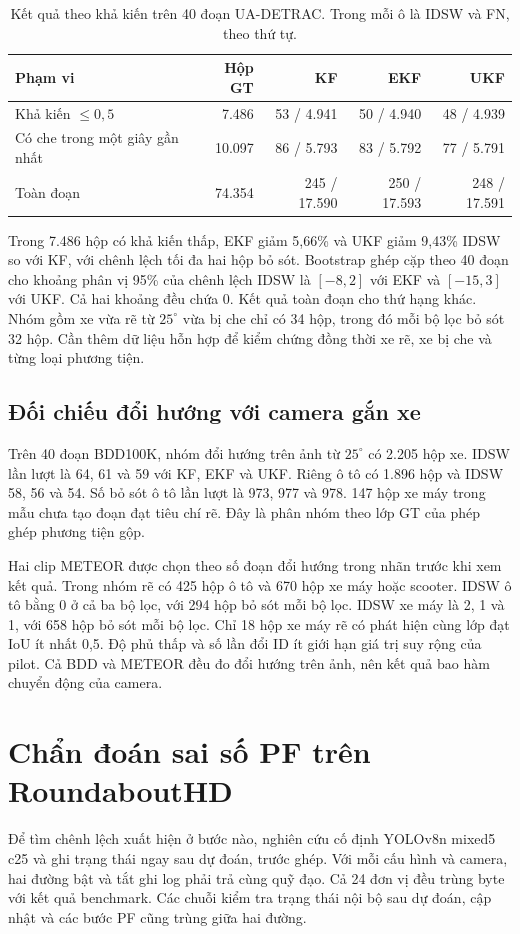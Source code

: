 \begin{table}[htbp]\centering\small
\caption{Kết quả theo khả kiến trên 40 đoạn UA-DETRAC. Trong mỗi ô là IDSW và FN, theo thứ tự.}\label{tab:ua-occlusion-r113}
\begin{tabular}{@{}lrrrr@{}}\toprule
Phạm vi & Hộp GT & KF & EKF & UKF\\\midrule
Khả kiến $\leq 0{,}5$ & 7.486 & 53 / 4.941 & 50 / 4.940 & 48 / 4.939\\
Có che trong một giây gần nhất & 10.097 & 86 / 5.793 & 83 / 5.792 & 77 / 5.791\\
Toàn đoạn & 74.354 & 245 / 17.590 & 250 / 17.593 & 248 / 17.591\\\bottomrule
\end{tabular}
\end{table}

Trong 7.486 hộp có khả kiến thấp, EKF giảm 5,66\% và UKF giảm 9,43\% IDSW so với KF, với chênh lệch tối đa hai hộp bỏ sót. Bootstrap ghép cặp theo 40 đoạn cho khoảng phân vị 95\% của chênh lệch IDSW là $[-8,2]$ với EKF và $[-15,3]$ với UKF. Cả hai khoảng đều chứa 0. Kết quả toàn đoạn cho thứ hạng khác. Nhóm gồm xe vừa rẽ từ $25^\circ$ vừa bị che chỉ có 34 hộp, trong đó mỗi bộ lọc bỏ sót 32 hộp. Cần thêm dữ liệu hỗn hợp để kiểm chứng đồng thời xe rẽ, xe bị che và từng loại phương tiện.

\subsection{Đối chiếu đổi hướng với camera gắn xe}
Trên 40 đoạn BDD100K, nhóm đổi hướng trên ảnh từ $25^\circ$ có 2.205 hộp xe. IDSW lần lượt là 64, 61 và 59 với KF, EKF và UKF. Riêng ô tô có 1.896 hộp và IDSW 58, 56 và 54. Số bỏ sót ô tô lần lượt là 973, 977 và 978. 147 hộp xe máy trong mẫu chưa tạo đoạn đạt tiêu chí rẽ. Đây là phân nhóm theo lớp GT của phép ghép phương tiện gộp.

Hai clip METEOR \cite{meteor} được chọn theo số đoạn đổi hướng trong nhãn trước khi xem kết quả. Trong nhóm rẽ có 425 hộp ô tô và 670 hộp xe máy hoặc scooter. IDSW ô tô bằng 0 ở cả ba bộ lọc, với 294 hộp bỏ sót mỗi bộ lọc. IDSW xe máy là 2, 1 và 1, với 658 hộp bỏ sót mỗi bộ lọc. Chỉ 18 hộp xe máy rẽ có phát hiện cùng lớp đạt IoU ít nhất 0,5. Độ phủ thấp và số lần đổi ID ít giới hạn giá trị suy rộng của pilot. Cả BDD và METEOR đều đo đổi hướng trên ảnh, nên kết quả bao hàm chuyển động của camera.

\section{Chẩn đoán sai số PF trên RoundaboutHD}
Để tìm chênh lệch xuất hiện ở bước nào, nghiên cứu cố định YOLOv8n mixed5 c25 và ghi trạng thái ngay sau dự đoán, trước ghép. Với mỗi cấu hình và camera, hai đường bật và tắt ghi log phải trả cùng quỹ đạo. Cả 24 đơn vị đều trùng byte với kết quả benchmark. Các chuỗi kiểm tra trạng thái nội bộ sau dự đoán, cập nhật và các bước PF cũng trùng giữa hai đường.


